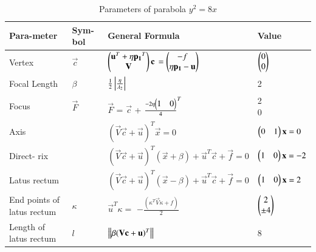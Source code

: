 \documentclass[journal,12pt,twocolumn]{IEEEtran}
\begin{document}
\begin{table}[!ht]
\begin{center}
\begin{tabular}{ | m{1.4cm} | m{1.0cm}| m{2.3cm} | m{2.4cm} | } 
\hline
Para-\newline meter  & Sym-\newline bol  & General \newline Formula & Value \\ 
\hline
Vertex & $\vec{c}$ & $\begin{pmatrix}\mathbf{u}^T + \eta\mathbf{p_1}^T \\ \mathbf{V}\end{pmatrix}\mathbf{c}$ \newline $= \begin{pmatrix}-f \\ \eta\mathbf{p_1} - \mathbf{u}\end{pmatrix}$ & $\begin{pmatrix}0\\0\end{pmatrix}$ \\ 
\hline
Focal \newline Length & $\beta$ & $\frac{1}{2}\left\vert\frac{\eta}{\lambda_2}\right\vert$ & 2 
\\ 
\hline
Focus \newline & $\vec{F}$ &  $\vec{F}$ = $\vec{c}$ +  \newline ${\frac{-2\eta\begin{pmatrix}1 & 0\end{pmatrix}}{4}}^{T}$ \newline & \myvec{2\\0}  \\
\hline
Axis &  & $(\vec{V}\vec{c}+\vec{u})^{T}\vec{x} = 0$  & $\begin{pmatrix}0 & 1\end{pmatrix}\mathbf{x}=0$ \\
\hline
Direct- \newline rix &  & $(\vec{V}\vec{c}+\vec{u})^T(\vec{x} +\beta) + \vec{u}^T\vec{c} + \vec{f} = 0$ \newline  &$\begin{pmatrix}1 & 0\end{pmatrix}\mathbf{x}=-2$\\
\hline
Latus \newline rectum & & $(\vec{V}\vec{c}+\vec{u})^T(\vec{x} -\beta) + \vec{u}^T\vec{c} + \vec{f} = 0$ & $\begin{pmatrix}1 & 0\end{pmatrix}\mathbf{x} = 2$ \\
\hline
End \newline points \newline of latus \newline rectum & $\kappa$ & $\vec{u}^T\kappa =$ \newline $-\frac{(\kappa^T\vec{V}\kappa + f )}{2}$ & $\begin{pmatrix}2 \\ \pm 4\end{pmatrix}$  \\
\hline
Length \newline of latus \newline rectum & $l$ & $\left\lVert\beta(\mathbf{V}\mathbf{c}+\mathbf{u})^T\right\rVert$ & 8  \\
\hline
\end{tabular}
\end{center}
\caption{Parameters of parabola $y^2=8x$}
\label{tab:table1}
\end{table}
\end{document}
